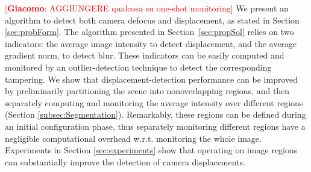 \documentclass{llncs}
\newcommand{\gi}[1]{{\textcolor{red}{[\small \textbf{Giacomo}: #1]}}}
\begin{document}
\gi{AGGIUNGERE qualcosa su one-shot monitoring}
We present an algorithm to detect both camera defocus and displacement, as stated in Section \ref{sec:probForm}. The algorithm presented in Section~\ref{sec:propSol} relies on two indicators: the average image intensity to detect displacement, and the average gradient norm, to detect blur. These indicators can be easily computed and monitored by an outlier-detection technique to detect the corresponding tampering. We show that displacement-detection performance can be improved by preliminarily partitioning the scene into nonoverlapping regions, and then separately computing and monitoring the average intensity over different regions (Section \ref{subsec:Segmentation}). Remarkably, these regions can be defined during an initial configuration phase, thus separately monitoring different regions have a negligible computational overhead w.r.t. monitoring the whole image. Experiments in Section \ref{sec:experiments} show that operating on image regions can substantially improve the detection of camera displacements. %
\end{document}
